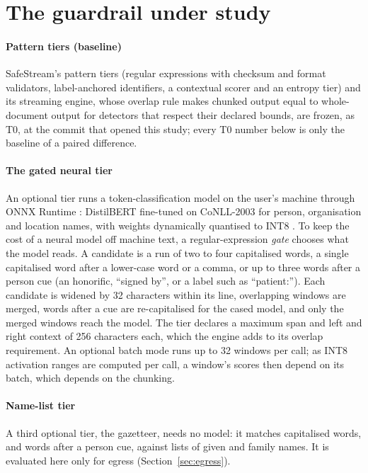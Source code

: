 \section{The guardrail under study}\label{sec:system}

\paragraph{Pattern tiers (baseline)} SafeStream's pattern tiers (regular expressions with checksum and format validators, label-anchored identifiers, a contextual scorer and an entropy tier) and its streaming engine, whose overlap rule makes chunked output equal to whole-document output for detectors that respect their declared bounds, are frozen, as T0, at the commit that opened this study; every T0 number below is only the baseline of a paired difference.

\paragraph{The gated neural tier} An optional tier runs a token-classification model on the user's machine through ONNX Runtime \cite{onnxruntime}: DistilBERT \cite{sanh2019distilbert} fine-tuned on CoNLL-2003 \cite{tjongkimsang2003conll} for person, organisation and location names, with weights dynamically quantised to INT8 \cite{jacob2018quantization}. To keep the cost of a neural model off machine text, a regular-expression \emph{gate} chooses what the model reads. A candidate is a run of two to four capitalised words, a single capitalised word after a lower-case word or a comma, or up to three words after a person cue (an honorific, ``signed by'', or a label such as ``patient:''). Each candidate is widened by 32 characters within its line, overlapping windows are merged, words after a cue are re-capitalised for the cased model, and only the merged windows reach the model. The tier declares a maximum span and left and right context of 256 characters each, which the engine adds to its overlap requirement. An optional batch mode runs up to 32 windows per call; as INT8 activation ranges are computed per call, a window's scores then depend on its batch, which depends on the chunking.

\paragraph{Name-list tier} A third optional tier, the gazetteer, needs no model: it matches capitalised words, and words after a person cue, against lists of given and family names. It is evaluated here only for egress (Section~\ref{sec:egress}).

